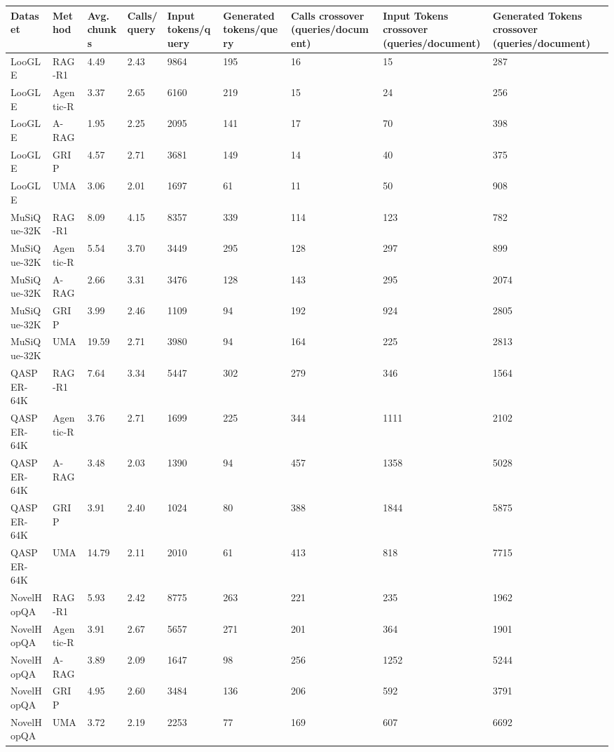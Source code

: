 \begin{tabular}{lllllllll}
\hline
Dataset & Method & Avg. chunks & Calls/query & Input tokens/query & Generated tokens/query & Calls crossover (queries/document) & Input Tokens crossover (queries/document) & Generated Tokens crossover (queries/document) \\
\hline
LooGLE & RAG-R1 & 4.49 & 2.43 & 9864 & 195 & 16 & 15 & 287 \\
LooGLE & Agentic-R & 3.37 & 2.65 & 6160 & 219 & 15 & 24 & 256 \\
LooGLE & A-RAG & 1.95 & 2.25 & 2095 & 141 & 17 & 70 & 398 \\
LooGLE & GRIP & 4.57 & 2.71 & 3681 & 149 & 14 & 40 & 375 \\
LooGLE & UMA & 3.06 & 2.01 & 1697 & 61 & 11 & 50 & 908 \\
MuSiQue-32K & RAG-R1 & 8.09 & 4.15 & 8357 & 339 & 114 & 123 & 782 \\
MuSiQue-32K & Agentic-R & 5.54 & 3.70 & 3449 & 295 & 128 & 297 & 899 \\
MuSiQue-32K & A-RAG & 2.66 & 3.31 & 3476 & 128 & 143 & 295 & 2074 \\
MuSiQue-32K & GRIP & 3.99 & 2.46 & 1109 & 94 & 192 & 924 & 2805 \\
MuSiQue-32K & UMA & 19.59 & 2.71 & 3980 & 94 & 164 & 225 & 2813 \\
QASPER-64K & RAG-R1 & 7.64 & 3.34 & 5447 & 302 & 279 & 346 & 1564 \\
QASPER-64K & Agentic-R & 3.76 & 2.71 & 1699 & 225 & 344 & 1111 & 2102 \\
QASPER-64K & A-RAG & 3.48 & 2.03 & 1390 & 94 & 457 & 1358 & 5028 \\
QASPER-64K & GRIP & 3.91 & 2.40 & 1024 & 80 & 388 & 1844 & 5875 \\
QASPER-64K & UMA & 14.79 & 2.11 & 2010 & 61 & 413 & 818 & 7715 \\
NovelHopQA & RAG-R1 & 5.93 & 2.42 & 8775 & 263 & 221 & 235 & 1962 \\
NovelHopQA & Agentic-R & 3.91 & 2.67 & 5657 & 271 & 201 & 364 & 1901 \\
NovelHopQA & A-RAG & 3.89 & 2.09 & 1647 & 98 & 256 & 1252 & 5244 \\
NovelHopQA & GRIP & 4.95 & 2.60 & 3484 & 136 & 206 & 592 & 3791 \\
NovelHopQA & UMA & 3.72 & 2.19 & 2253 & 77 & 169 & 607 & 6692 \\
\hline
\end{tabular}
